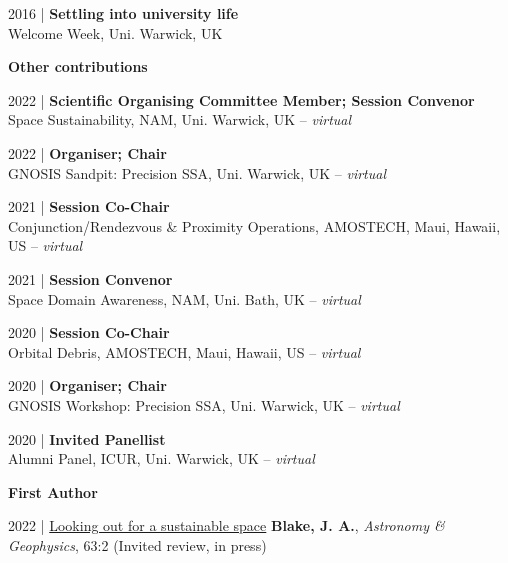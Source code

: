\documentclass[10pt,a4paper]{altacv}
\begin{document}
\smallskip

\small 2016 | \textbf{Settling into university life} \\
Welcome Week, Uni. Warwick, UK

\divider

\normalsize \textbf{Other contributions}

\medskip

\small 2022 | \textbf{Scientific Organising Committee Member; Session Convenor} \\
Space Sustainability, NAM, Uni. Warwick, UK -- \textit{virtual}

\smallskip

\small 2022 | \textbf{Organiser; Chair} \\
GNOSIS Sandpit: Precision SSA, Uni. Warwick, UK -- \textit{virtual}

\smallskip

\small 2021 | \textbf{Session Co-Chair} \\
Conjunction/Rendezvous \& Proximity Operations, AMOSTECH, Maui, Hawaii, US -- \textit{virtual}

\smallskip

\small 2021 | \textbf{Session Convenor} \\
Space Domain Awareness, NAM, Uni. Bath, UK -- \textit{virtual}

\smallskip

\small 2020 | \textbf{Session Co-Chair} \\
Orbital Debris, AMOSTECH, Maui, Hawaii, US -- \textit{virtual}

\smallskip

\small 2020 | \textbf{Organiser; Chair} \\
GNOSIS Workshop: Precision SSA, Uni. Warwick, UK -- \textit{virtual}

\smallskip

\small 2020 | \textbf{Invited Panellist} \\
Alumni Panel, ICUR, Uni. Warwick, UK -- \textit{virtual}

\medskip


\normalsize \textbf{First Author} 

\medskip

\small
2022 | \href{https://www.researchgate.net/publication/358504609_Looking_out_for_a_sustainable_space}{Looking out for a sustainable space}
\textbf{Blake, J. A.}, \textit{Astronomy \& Geophysics}, 63:2 (Invited review, in press)
\end{document}
